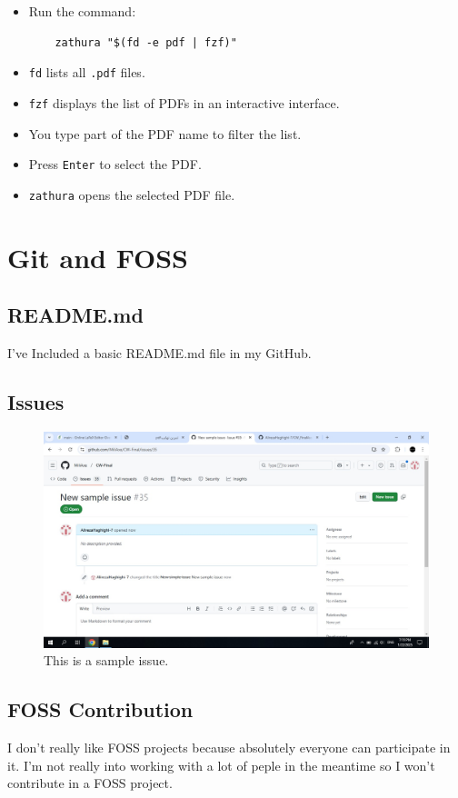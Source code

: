 \documentclass{article}
\newcounter{subsubsubsection}[subsubsection]
\begin{document}
\begin{itemize}
    \item Run the command:
    \begin{verbatim}
    zathura "$(fd -e pdf | fzf)"
    \end{verbatim}
    \item \texttt{fd} lists all \texttt{.pdf} files.
    \item \texttt{fzf} displays the list of PDFs in an interactive interface.
    \item You type part of the PDF name to filter the list.
    \item Press \texttt{Enter} to select the PDF.
    \item \texttt{zathura} opens the selected PDF file.
\end{itemize}

\section{Git and FOSS}
\subsection{README.md}
I've Included a basic README.md file in my GitHub.

\newpage
\subsection{Issues}
\begin{figure}[htbp]
    \centering
    \includegraphics[width=1.3\textwidth]{Untitled.jpg}
    \caption{This is a sample issue.}
\end{figure}

\subsection{FOSS Contribution}
I don't really like FOSS projects because absolutely everyone can participate in it. I'm not really into working with a lot of peple in the meantime so I won't  contribute in a FOSS project.
\end{document}
